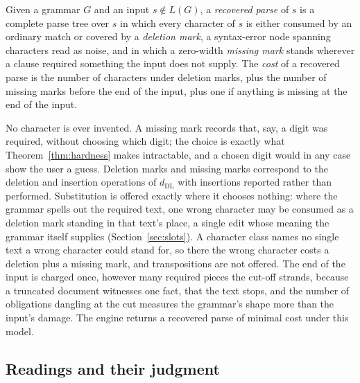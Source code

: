 \documentclass[manuscript]{acmart}
\begin{document}
\begin{definition}
\label{def:recovered}
Given a grammar $G$ and an input $s \notin L(G)$, a \emph{recovered parse} of $s$ is a complete parse tree over $s$ in which every character of $s$ is either consumed by an ordinary match or covered by a \emph{deletion mark}, a syntax-error node spanning characters read as noise, and in which a zero-width \emph{missing mark} stands wherever a clause required something the input does not supply. The \emph{cost} of a recovered parse is the number of characters under deletion marks, plus the number of missing marks before the end of the input, plus one if anything is missing at the end of the input.
\end{definition}

No character is ever invented. A missing mark records that, say, a digit was required, without choosing which digit; the choice is exactly what Theorem~\ref{thm:hardness} makes intractable, and a chosen digit would in any case show the user a guess. Deletion marks and missing marks correspond to the deletion and insertion operations of $d_{\mathrm{DL}}$ with insertions reported rather than performed. Substitution is offered exactly where it chooses nothing: where the grammar spells out the required text, one wrong character may be consumed as a deletion mark standing in that text's place, a single edit whose meaning the grammar itself supplies (Section~\ref{sec:slots}). A character class names no single text a wrong character could stand for, so there the wrong character costs a deletion plus a missing mark, and transpositions are not offered. The end of the input is charged once, however many required pieces the cut-off strands, because a truncated document witnesses one fact, that the text stops, and the number of obligations dangling at the cut measures the grammar's shape more than the input's damage. The engine returns a recovered parse of minimal cost under this model.

\subsection{Readings and their judgment}
\label{sec:readings}
\end{document}
